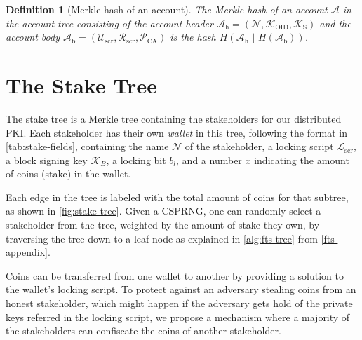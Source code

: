 \documentclass{style/kththesis}
\newtheorem{definition}{Definition}
\begin{document}
\begin{definition}[Merkle hash of an account]
\label{account-hash}
The Merkle hash of an account $\mathcal{A}$ in the account tree consisting of the account header $\mathcal{A}_{\text{h}} = (\mathcal{N}, \mathcal {K}_{\text{OID}}, \mathcal{K}_{\text{S}})$ and the account body $\mathcal{A}_{\text{b}} = (\mathcal{U}_{\text{scr}}, \mathcal{R}_{\text{scr}}, \mathcal{P}_{\text{CA}})$ is the hash $H(\mathcal{A}_{\text{h}}\text{ | } H(\mathcal{A}_{\text{b}}))$.
\end{definition}

\section{The Stake Tree}
\label{stake-tree}
The stake tree is a Merkle tree containing the stakeholders for our distributed PKI. Each stakeholder has their own \emph{wallet} in this tree, following the format in \cref{tab:stake-fields}, containing the name $\mathcal{N}$ of the stakeholder, a locking script $\mathcal{L}_{\text{scr}}$, a block signing key $\mathcal{K}_B$, a locking bit $b_l$, and a number $x$ indicating the amount of coins (stake) in the wallet.

Each edge in the tree is labeled with the total amount of coins for that subtree, as shown in \cref{fig:stake-tree}. Given a CSPRNG, one can randomly select a stakeholder from the tree, weighted by the amount of stake they own, by traversing the tree down to a leaf node as explained in \cref{alg:fts-tree} from \cref{fts-appendix}.

Coins can be transferred from one wallet to another by providing a solution to the wallet's locking script. To protect against an adversary stealing coins from an honest stakeholder, which might happen if the adversary gets hold of the private keys referred in the locking script, we propose a mechanism where a majority of the stakeholders can confiscate the coins of another stakeholder.
\end{document}
